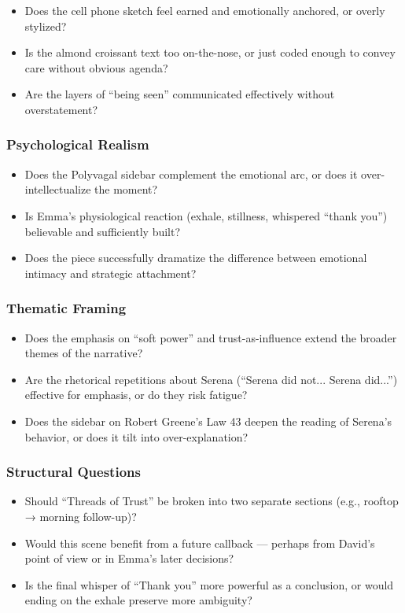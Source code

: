 \begin{itemize}
  \item Does the cell phone sketch feel earned and emotionally anchored, or overly stylized?
  \item Is the almond croissant text too on-the-nose, or just coded enough to convey care without obvious agenda?
  \item Are the layers of “being seen” communicated effectively without overstatement?
\end{itemize}

\subsubsection*{Psychological Realism}

\begin{itemize}
  \item Does the Polyvagal sidebar complement the emotional arc, or does it over-intellectualize the moment?
  \item Is Emma’s physiological reaction (exhale, stillness, whispered ``thank you'') believable and sufficiently built?
  \item Does the piece successfully dramatize the difference between emotional intimacy and strategic attachment?
\end{itemize}

\subsubsection*{Thematic Framing}

\begin{itemize}
  \item Does the emphasis on “soft power” and trust-as-influence extend the broader themes of the narrative?
  \item Are the rhetorical repetitions about Serena (``Serena did not... Serena did...'') effective for emphasis, or do they risk fatigue?
  \item Does the sidebar on Robert Greene's Law 43 deepen the reading of Serena’s behavior, or does it tilt into over-explanation?
\end{itemize}

\subsubsection*{Structural Questions}

\begin{itemize}
  \item Should ``Threads of Trust'' be broken into two separate sections (e.g., rooftop → morning follow-up)?
  \item Would this scene benefit from a future callback — perhaps from David’s point of view or in Emma’s later decisions?
  \item Is the final whisper of ``Thank you'' more powerful as a conclusion, or would ending on the exhale preserve more ambiguity?
\end{itemize}







